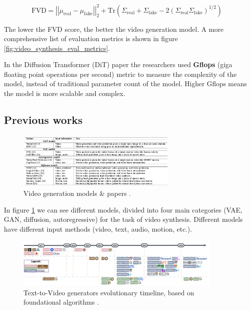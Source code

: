 \begin{equation*}
    \text{FVD} = \left| \left| \mu_{\text{real}} - \mu_{\text{fake}} \right| \right|^2_2 + \text{Tr} \left( \Sigma_{\text{real}} + \Sigma_{\text{fake}} - 2 \left( \Sigma_{\text{real}} \Sigma_{\text{fake}} \right)^{1/2} \right)
\end{equation*}

The lower the FVD score, the better the video generation model. A more comprehensive list of evaluation metrics is shown in figure \ref{fig:video_synthesis_eval_metrics}.

In the Diffusion Transformer (DiT) paper \cite{diffusion_transformer} the researchers used \textbf{Gflops} (giga floating point operations per second) metric to measure the complexity of the model, instead of traditional parameter count of the model. Higher Gflops means the model is more scalable and complex.








\subsection{Previous works}

\begin{figure}
    \centering
    \includegraphics[width=0.7\textwidth]{images/video_synthesis/previous_works.png}
    \caption{Video generation models \& papers \cite{zhou2024survey}.}
    \label{fig:video_synthesis_previous_works}
\end{figure}

In figure \ref{fig:video_synthesis_previous_works} we can see different models, divided into four main categories (VAE, GAN, diffusion, autoregressive) for the task of video synthesis. Different models have different input methods (video, text, audio, motion, etc.).

\begin{figure}
    \centering
    \includegraphics[width=0.9\textwidth]{images/video_synthesis/timeline.png}
    \caption{Text-to-Video generators evolutionary timeline, based on foundational algorithms \cite{sun2024sora}.}
    \label{fig:video_synthesis_timeline}
\end{figure}

